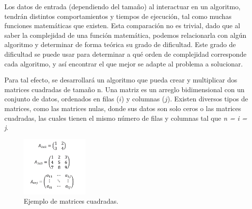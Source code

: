 \documentclass[11pt, twocolumn]{llncs}
\begin{document}
Los datos de entrada (dependiendo del tamaño) al interactuar en un algoritmo, tendrán distintos comportamientos y tiempos de ejecución, tal como muchas funciones matemáticas que existen. Esta comparación no es trivial, dado que al saber la complejidad de una función matemática, podemos relacionarla con algún algoritmo y determinar de forma teórica su grado de dificultad. Este grado de dificultad se puede usar para determinar a qué orden de complejidad corresponde cada algoritmo, y así encontrar el que mejor se adapte al problema a solucionar.

Para tal efecto, se desarrollará un algoritmo que pueda crear y multiplicar dos matrices cuadradas de tamaño n. Una matriz es un arreglo bidimensional con un conjunto de datos, ordenados en filas ($i$) y columnas ($j$). Existen diversos tipos de matrices, como las matrices nulas, donde sus datos son solo ceros o las matrices cuadradas, las cuales tienen el mismo número de filas y columnas tal que \textit{n = i = j}.

\begin{figure}
\centering
\includegraphics[width=0.3\textwidth]{matrices.png}
\caption{\label{fig:matrices}Ejemplo de matrices cuadradas.}
\end{figure}
\end{document}
